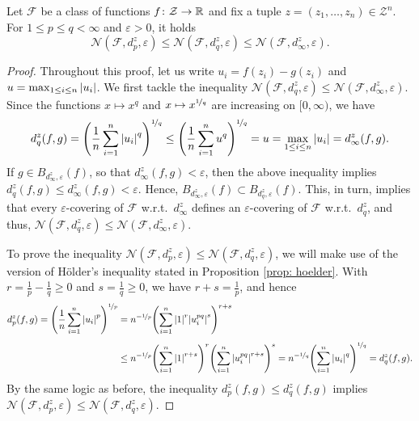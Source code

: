 \begin{proposition}
Let $\mathcal{F}$ be a class of functions $f \colon \mathcal{Z} \to \mathbb{R}$ and fix a tuple $z = (z_1, \dots, z_n) \in \mathcal{Z}^n$. For $1 \leq p \leq q < \infty$ and $\varepsilon > 0$, it holds
\[
    \mathcal{N}(\mathcal{F}, d_p^z, \varepsilon) \leq \mathcal{N}(\mathcal{F}, d_q^z, \varepsilon) \leq \mathcal{N}(\mathcal{F}, d_{\infty}^z, \varepsilon).
\]
\end{proposition}

\begin{proof}
Throughout this proof, let us write $u_i = f(z_i) - g(z_i)$ and $u = \max_{1 \leq i \leq n} \abs{u_i}$. We first tackle the inequality $\mathcal{N}(\mathcal{F}, d_q^z, \varepsilon) \leq \mathcal{N}(\mathcal{F}, d_{\infty}^z, \varepsilon)$. Since the functions $x \mapsto x^q$ and $x \mapsto x^{\nicefrac{1}{q}}$ are increasing on $[0, \infty)$, we have
\[
    d_q^z(f, g) = \left(\frac{1}{n} \sum_{i=1}^n \abs{u_i}^q\right)^{\nicefrac{1}{q}} \leq \left(\frac{1}{n} \sum_{i=1}^n u^q\right)^{\nicefrac{1}{q}} = u = \max_{1 \leq i \leq n} \abs{u_i} = d_{\infty}^z(f, g).
\]
If $g \in B_{d_{\infty}^z, \varepsilon}(f)$, so that $d_{\infty}^z(f, g) < \varepsilon$, then the above inequality implies $d_q^z(f, g) \leq d_{\infty}^z(f, g) < \varepsilon$. Hence, $B_{d_{\infty}^z, \varepsilon}(f) \subset B_{d_q^z, \varepsilon}(f)$. This, in turn, implies that every $\varepsilon$-covering of $\mathcal{F}$ w.r.t.\ $d_{\infty}^z$ defines an $\varepsilon$-covering of $\mathcal{F}$ w.r.t.\ $d_q^z$, and thus, $\mathcal{N}(\mathcal{F}, d_q^z, \varepsilon) \leq \mathcal{N}(\mathcal{F}, d_{\infty}^z, \varepsilon)$.

To prove the inequality $\mathcal{N}(\mathcal{F}, d_p^z, \varepsilon) \leq \mathcal{N}(\mathcal{F}, d_q^z, \varepsilon)$, we will make use of the version of H{\"o}lder's inequality stated in Proposition \ref{prop: hoelder}. With $r = \frac{1}{p} - \frac{1}{q} \geq 0$ and $s = \frac{1}{q} \geq 0$, we have $r + s = \frac{1}{p}$, and hence
\begin{align*}
    d_p^z(f, g) = \left(\frac{1}{n} \sum_{i=1}^n \abs{u_i}^p\right)^{\nicefrac{1}{p}} &= n^{-\nicefrac{1}{p}} \left(\sum_{i=1}^n \abs{1}^r \abs{u_i^{pq}}^s\right)^{r+s} \\[4pt]
    &\leq n^{-\nicefrac{1}{p}} \left(\sum_{i=1}^n \abs{1}^{r+s}\right)^r \left(\sum_{i=1}^n \abs{u_i^{pq}}^{r+s}\right)^s = n^{-\nicefrac{1}{q}} \left(\sum_{i=1}^n \abs{u_i}^{q}\right)^{\nicefrac{1}{q}} = d_q^z(f, g).
\end{align*}
By the same logic as before, the inequality $d_p^z(f, g) \leq d_q^z(f, g)$ implies $\mathcal{N}(\mathcal{F}, d_p^z, \varepsilon) \leq \mathcal{N}(\mathcal{F}, d_q^z, \varepsilon)$.
\end{proof}
